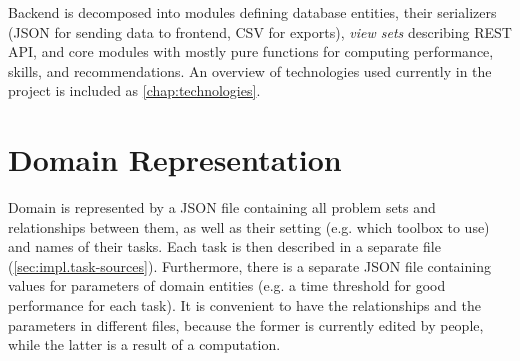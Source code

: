 
Backend is decomposed into modules defining database entities,
their serializers (JSON for sending data to frontend, CSV for exports),
\emph{view sets} describing REST API, %
and core modules with mostly pure functions
for computing performance, skills, and recommendations.
An overview of technologies used currently in the project
is included as \cref{chap:technologies}.

\section{Domain Representation}

Domain is represented by a JSON file containing all problem sets %
and relationships between them, as well as their setting (e.g. which toolbox to use)
and names of their tasks.
Each task is then described in a separate file (\cref{sec:impl.task-sources}).
Furthermore, there is a separate JSON file containing values for parameters
of domain entities (e.g. a time threshold for good performance for each task).
It is convenient to have the relationships and the parameters in different files,
because the former is currently edited by people, while the latter is
a result of a computation.

